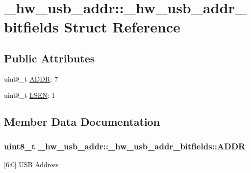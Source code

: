 \hypertarget{struct__hw__usb__addr_1_1__hw__usb__addr__bitfields}{}\section{\+\_\+hw\+\_\+usb\+\_\+addr\+:\+:\+\_\+hw\+\_\+usb\+\_\+addr\+\_\+bitfields Struct Reference}
\label{struct__hw__usb__addr_1_1__hw__usb__addr__bitfields}
\subsection*{Public Attributes}
\begin{DoxyCompactItemize}
\item 
uint8\+\_\+t \hyperlink{struct__hw__usb__addr_1_1__hw__usb__addr__bitfields_a8941e4a34264eec6a67aeb8dde603fd5}{A\+D\+DR}\+: 7
\item 
uint8\+\_\+t \hyperlink{struct__hw__usb__addr_1_1__hw__usb__addr__bitfields_ad148f07642d2ee0da856de1df4f55305}{L\+S\+EN}\+: 1
\end{DoxyCompactItemize}


\subsection{Member Data Documentation}
\subsubsection[{\texorpdfstring{A\+D\+DR}{ADDR}}]{\setlength{\rightskip}{0pt plus 5cm}uint8\+\_\+t \+\_\+hw\+\_\+usb\+\_\+addr\+::\+\_\+hw\+\_\+usb\+\_\+addr\+\_\+bitfields\+::\+A\+D\+DR}\hypertarget{struct__hw__usb__addr_1_1__hw__usb__addr__bitfields_a8941e4a34264eec6a67aeb8dde603fd5}{}\label{struct__hw__usb__addr_1_1__hw__usb__addr__bitfields_a8941e4a34264eec6a67aeb8dde603fd5}
\mbox{[}6\+:0\mbox{]} U\+SB Address 
